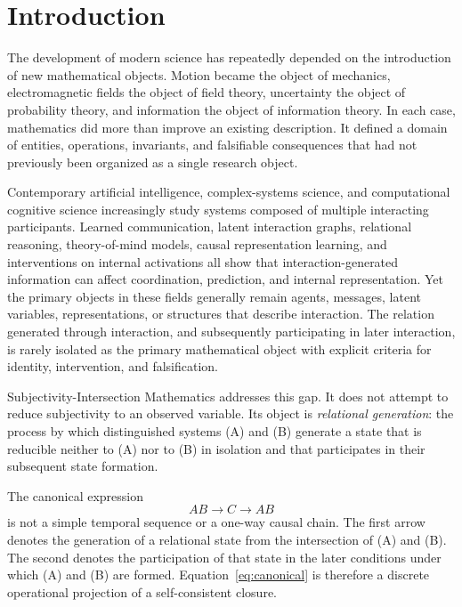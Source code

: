 \documentclass[11pt,a4paper]{article}
\begin{document}
\clearpage
\tableofcontents
\clearpage

\section{Introduction}

The development of modern science has repeatedly depended on the introduction of new mathematical objects. Motion became the object of mechanics, electromagnetic fields the object of field theory, uncertainty the object of probability theory, and information the object of information theory. In each case, mathematics did more than improve an existing description. It defined a domain of entities, operations, invariants, and falsifiable consequences that had not previously been organized as a single research object.

Contemporary artificial intelligence, complex-systems science, and computational cognitive science increasingly study systems composed of multiple interacting participants. Learned communication, latent interaction graphs, relational reasoning, theory-of-mind models, causal representation learning, and interventions on internal activations all show that interaction-generated information can affect coordination, prediction, and internal representation. Yet the primary objects in these fields generally remain agents, messages, latent variables, representations, or structures that describe interaction. The relation generated through interaction, and subsequently participating in later interaction, is rarely isolated as the primary mathematical object with explicit criteria for identity, intervention, and falsification.

Subjectivity-Intersection Mathematics addresses this gap. It does not attempt to reduce subjectivity to an observed variable. Its object is \emph{relational generation}: the process by which distinguished systems (A) and (B) generate a state that is reducible neither to (A) nor to (B) in isolation and that participates in their subsequent state formation.

The canonical expression
\begin{equation}
  AB \rightarrow C \rightarrow AB
  \label{eq:canonical}
\end{equation}
is not a simple temporal sequence or a one-way causal chain. The first arrow denotes the generation of a relational state from the intersection of (A) and (B). The second denotes the participation of that state in the later conditions under which (A) and (B) are formed. Equation~\eqref{eq:canonical} is therefore a discrete operational projection of a self-consistent closure.
\end{document}
